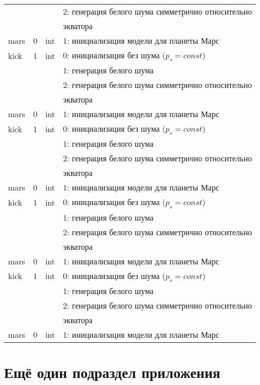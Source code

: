 \begin{longtable}[c]{|l|c|l|l|}
      &   &     & 2: генерация белого шума симметрично относительно \\
  & & & экватора    \\
 mars & 0 & int & 1: инициализация модели для планеты Марс     \\
kick & 1 & int & 0: инициализация без шума ($p_s = const$) \\
      &   &     & 1: генерация белого шума                  \\
      &   &     & 2: генерация белого шума симметрично относительно \\
  & & & экватора    \\
 mars & 0 & int & 1: инициализация модели для планеты Марс     \\
kick & 1 & int & 0: инициализация без шума ($p_s = const$) \\
      &   &     & 1: генерация белого шума                  \\
      &   &     & 2: генерация белого шума симметрично относительно \\
  & & & экватора    \\
 mars & 0 & int & 1: инициализация модели для планеты Марс     \\
kick & 1 & int & 0: инициализация без шума ($p_s = const$) \\
      &   &     & 1: генерация белого шума                  \\
      &   &     & 2: генерация белого шума симметрично относительно \\
  & & & экватора    \\
 mars & 0 & int & 1: инициализация модели для планеты Марс     \\
kick & 1 & int & 0: инициализация без шума ($p_s = const$) \\
      &   &     & 1: генерация белого шума                  \\
      &   &     & 2: генерация белого шума симметрично относительно \\
  & & & экватора    \\
 mars & 0 & int & 1: инициализация модели для планеты Марс     \\ 
 \hline 
\end{longtable}

\normalsize%
\section{Ещё один подраздел приложения} \label{AppendixB2}

